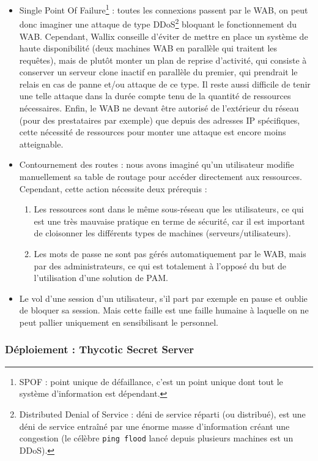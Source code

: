 \begin{itemize}
	\item Single Point Of Failure\footnote{SPOF : point unique de défaillance, c'est un point unique dont tout le système d'information est dépendant.} : toutes les connexions passent par le WAB, on peut donc imaginer une attaque de type DDoS\footnote{Distributed Denial of Service : déni de service réparti (ou distribué), est une déni de service entraîné par une énorme masse d'information créant une congestion (le célèbre \texttt{ping flood} lancé depuis plusieurs machines est un DDoS).} bloquant le fonctionnement du WAB. Cependant, Wallix conseille d'éviter de mettre en place un système de haute disponibilité (deux machines WAB en parallèle qui traitent les requêtes), mais de plutôt monter un plan de reprise d'activité, qui consiste à conserver un serveur clone inactif en parallèle du premier, qui prendrait le relais en cas de panne et/ou attaque de ce type. Il reste aussi difficile de tenir une telle attaque dans la durée compte tenu de la quantité de ressources nécessaires. Enfin, le WAB ne devant être autorisé de l'extérieur du réseau (pour des prestataires par exemple) que depuis des adresses IP spécifiques, cette nécessité de ressources pour monter une attaque est encore moins atteignable.
	\item Contournement des routes : nous avons imaginé qu'un utilisateur modifie manuellement sa table de routage pour accéder directement aux ressources. Cependant, cette action nécessite deux prérequis :
	\begin{enumerate}
		\item Les ressources sont dans le même sous-réseau que les utilisateurs, ce qui est une très mauvaise pratique en terme de sécurité, car il est important de cloisonner les différents types de machines (serveurs/utilisateurs).
		\item Les mots de passe ne sont pas gérés automatiquement par le WAB, mais par des administrateurs, ce qui est totalement à l'opposé du but de l'utilisation d'une solution de PAM.
	\end{enumerate}
	\item Le vol d'une session d'un utilisateur, s'il part par exemple en pause et oublie de bloquer sa session. Mais cette faille est une faille humaine à laquelle on ne peut pallier uniquement en sensibilisant le personnel.
\end{itemize}

\subsubsection{Déploiement : Thycotic Secret Server}
\label{par:depss}

